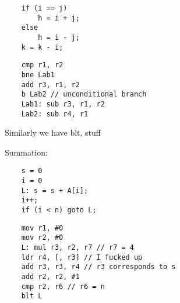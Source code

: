 \documentclass{scrartcl}
\begin{document}
\begin{lstlisting}
	if (i == j)
		h = i + j;
	else
		h = i - j;
	k = k - i;
\end{lstlisting}
\begin{lstlisting}
	cmp r1, r2
	bne Lab1
	add r3, r1, r2
	b Lab2 // unconditional branch
	Lab1: sub r3, r1, r2
	Lab2: sub r4, r1
\end{lstlisting}
Similarly we have blt, stuff

Summation:
\begin{lstlisting}
	s = 0
	i = 0
	L: s = s + A[i];
	i++;
	if (i < n) goto L;
\end{lstlisting}
\begin{lstlisting}
	mov r1, #0
	mov r2, #0
	L: mul r3, r2, r7 // r7 = 4
	ldr r4, [, r3] // I fucked up
	add r3, r3, r4 // r3 corresponds to s
	add r2, r2, #1
	cmp r2, r6 // r6 = n
	blt L
\end{lstlisting}
\end{document}
